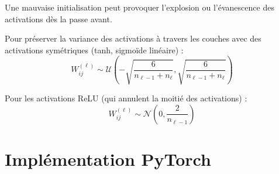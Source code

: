 Une mauvaise initialisation peut provoquer l'explosion ou l'\'evanescence des activations d\`es la passe avant.

\begin{mathbox}[title=\textbf{Initialisation de Xavier/Glorot (2010)}]
Pour pr\'eserver la variance des activations \`a travers les couches avec des activations sym\'etriques (tanh, sigmo\"ide lin\'eaire) :
\[
W^{(\ell)}_{ij} \sim \mathcal{U}\!\left(-\sqrt{\frac{6}{n_{\ell-1}+n_\ell}}, \sqrt{\frac{6}{n_{\ell-1}+n_\ell}}\right)
\]
\end{mathbox}

\begin{mathbox}[title=\textbf{Initialisation de He/Kaiming (2015)}]
Pour les activations ReLU (qui annulent la moiti\'e des activations) :
\[
W^{(\ell)}_{ij} \sim \mathcal{N}\!\left(0, \frac{2}{n_{\ell-1}}\right)
\]
\end{mathbox}

\section{Impl\'ementation PyTorch}
\label{sec:impl_mlp}

